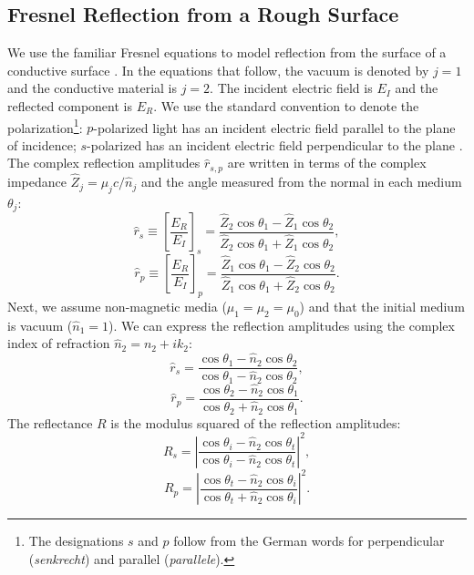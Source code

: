 \subsection{Fresnel Reflection from a Rough Surface}

We use the familiar Fresnel equations to model reflection from the surface of a conductive surface \cite{zangwillModernElectrodynamics2013}. In the equations that follow, the vacuum is denoted by $j=1$ and the conductive material is $j=2$. The incident electric field is $E_I$ and the reflected component is $E_R$. We use the standard convention to denote the polarization\footnote{The designations $s$ and $p$ follow from the German words for perpendicular (\textit{senkrecht}) and parallel (\textit{parallele}).}: $p$-polarized light has an incident electric field parallel to the plane of incidence; $s$-polarized has an incident electric field perpendicular to the plane \cite{attwoodSoftXraysExtreme2000}. The complex reflection amplitudes $\hat{r}_{s,p}$ are written in terms of the complex impedance $\hat{Z}_j = \mu_j c / \hat{n}_j$ and the angle measured from the normal in each medium $\theta_j$:
\begin{equation}
\hat{r}_s \equiv \left[ \frac{E_R}{E_I} \right]_s = \frac{\hat{Z}_2 \cos \theta_1 - \hat{Z}_1 \cos \theta_2}{\hat{Z}_2 \cos \theta_1 + \hat{Z}_1 \cos \theta_2},
\label{eqn:Fresnel_rs_1}
\end{equation}
\begin{equation}
\hat{r}_p \equiv \left[ \frac{E_R}{E_I} \right]_p = \frac{\hat{Z}_1 \cos \theta_1 - \hat{Z}_2 \cos \theta_2}{\hat{Z}_1 \cos \theta_1 + \hat{Z}_2 \cos \theta_2}.
\label{eqn:Fresnel_rp_1}
\end{equation}
Next, we assume non-magnetic media ($\mu_1=\mu_2=\mu_0$) and that the initial medium is vacuum ($\hat{n}_1 = 1$). We can express the reflection amplitudes using the complex index of refraction $\hat{n}_2 = n_2 + i k_2$:
\begin{equation}
\hat{r}_s = \frac{ \cos \theta_1 - \hat{n}_2 \cos \theta_2}{ \cos \theta_1 - \hat{n}_2 \cos \theta_2},
\label{eqn:Fresnel_rs_2}
\end{equation}
\begin{equation}
\hat{r}_p = \frac{ \cos \theta_2 - \hat{n}_2 \cos \theta_1}{ \cos \theta_2 + \hat{n}_2 \cos \theta_1}.
\label{eqn:Fresnel_rp_2}
\end{equation}
The reflectance $R$ is the modulus squared of the reflection amplitudes:
\begin{equation}
R_s = \left| \frac{ \cos \theta_i - \hat{n}_2 \cos \theta_t}{ \cos \theta_i - \hat{n}_2 \cos \theta_t} \right|^2,
\label{eqn:Fresnel_Rs_1}
\end{equation}
\begin{equation}
R_p = \left| \frac{ \cos \theta_t - \hat{n}_2 \cos \theta_i}{ \cos \theta_t + \hat{n}_2 \cos \theta_i} \right|^2.
\label{eqn:Fresnel_Rp_1}
\end{equation}

